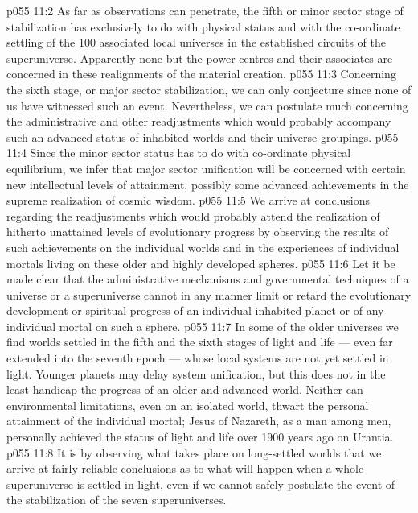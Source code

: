 \vs p055 11:2 \pc {} As far as observations can penetrate, the fifth or minor sector stage of stabilization has exclusively to do with physical status and with the co\hyp{}ordinate settling of the 100 associated local universes in the established circuits of the superuniverse. Apparently none but the power centres and their associates are concerned in these realignments of the material creation.
\vs p055 11:3 \pc {} Concerning the sixth stage, or major sector stabilization, we can only conjecture since none of us have witnessed such an event. Nevertheless, we can postulate much concerning the administrative and other readjustments which would probably accompany such an advanced status of inhabited worlds and their universe groupings.
\vs p055 11:4 Since the minor sector status has to do with co\hyp{}ordinate physical equilibrium, we infer that major sector unification will be concerned with certain new intellectual levels of attainment, possibly some advanced achievements in the supreme realization of cosmic wisdom.
\vs p055 11:5 \pc We arrive at conclusions regarding the readjustments which would probably attend the realization of hitherto unattained levels of evolutionary progress by observing the results of such achievements on the individual worlds and in the experiences of individual mortals living on these older and highly developed spheres.
\vs p055 11:6 Let it be made clear that the administrative mechanisms and governmental techniques of a universe or a superuniverse cannot in any manner limit or retard the evolutionary development or spiritual progress of an individual inhabited planet or of any individual mortal on such a sphere.
\vs p055 11:7 In some of the older universes we find worlds settled in the fifth and the sixth stages of light and life --- even far extended into the seventh epoch --- whose local systems are not yet settled in light. Younger planets may delay system unification, but this does not in the least handicap the progress of an older and advanced world. Neither can environmental limitations, even on an isolated world, thwart the personal attainment of the individual mortal; Jesus of Nazareth, as a man among men, personally achieved the status of light and life over 1900 years ago on Urantia.
\vs p055 11:8 It is by observing what takes place on long\hyp{}settled worlds that we arrive at fairly reliable conclusions as to what will happen when a whole superuniverse is settled in light, even if we cannot safely postulate the event of the stabilization of the seven superuniverses.
